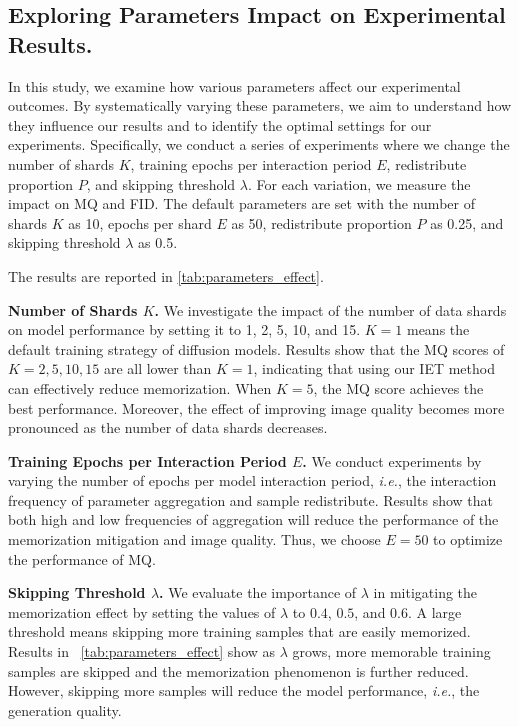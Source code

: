 \subsection{Exploring Parameters Impact on Experimental Results.}
\label{sec:impact}
In this study, we examine how various parameters affect our experimental outcomes.
By systematically varying these parameters, we aim to understand how they influence our results and to identify the optimal settings for our experiments. 
Specifically, we conduct a series of experiments where we change the number of shards $K$, training epochs per interaction period $E$, redistribute proportion $P$, and skipping threshold $\lambda$. For each variation, we measure the impact on MQ and FID. The default parameters are set with the number of shards $K$ as 10, epochs per shard $E$ as 50, redistribute proportion $P$ as 0.25, and skipping threshold $\lambda$ as 0.5.

The results are reported in \cref{tab:parameters_effect}.



\textbf{Number of Shards $K$.} We investigate the impact of the number of data shards on model performance by setting it to 1, 2, 5, 10, and 15. $K=1$ means the default training strategy of diffusion models. Results show that the MQ scores of $K=2, 5, 10, 15$ are all lower than $K=1$, indicating that using our IET method can effectively reduce memorization. When $K=5$, the MQ score achieves the best performance. Moreover, the effect of improving image quality becomes more pronounced as the number of data shards decreases.


\textbf{Training Epochs per Interaction Period $E$.} 
We conduct experiments by varying the number of epochs per model interaction period, \MakeLowercase{\textit{i.e.}}, the interaction frequency of parameter aggregation and sample redistribute. Results show that both high and low frequencies of aggregation will reduce the performance of the memorization mitigation and image quality. Thus, we choose $E=50$ to optimize the performance of MQ.



\textbf{Skipping Threshold $\lambda$.} We evaluate the importance of $\lambda$ in mitigating the memorization effect by setting the values of $\lambda$ to $0.4$, $0.5$, and $0.6$. A large threshold means skipping more training samples that are easily memorized. Results in ~\cref{tab:parameters_effect} show as $\lambda$ grows, more memorable training samples are skipped and the memorization phenomenon is further reduced. However, skipping more samples will reduce the model performance, \MakeLowercase{\textit{i.e.}}, the generation quality. 
